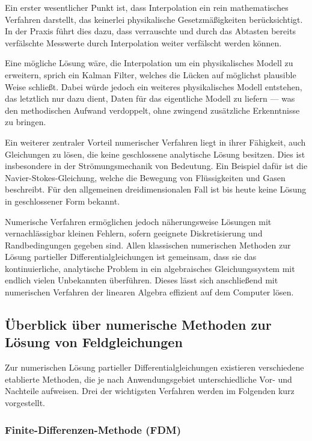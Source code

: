 Ein erster wesentlicher Punkt ist, dass Interpolation ein rein mathematisches Verfahren darstellt, das keinerlei physikalische Gesetzmäßigkeiten berücksichtigt.
In der Praxis führt dies dazu, dass verrauschte und durch das Abtasten bereits verfälschte Messwerte durch Interpolation weiter verfälscht werden können.

Eine mögliche Lösung wäre, die Interpolation um ein physikalisches Modell zu erweitern, sprich ein Kalman Filter, welches die Lücken auf möglichst plausible Weise schließt.
Dabei würde jedoch ein weiteres physikalisches Modell entstehen, das letztlich nur dazu dient, Daten für das eigentliche Modell zu liefern --- was den methodischen Aufwand verdoppelt, ohne zwingend zusätzliche Erkenntnisse zu bringen.

Ein weiterer zentraler Vorteil numerischer Verfahren liegt in ihrer Fähigkeit, auch Gleichungen zu lösen, die keine geschlossene analytische Lösung besitzen.
Dies ist insbesondere in der Strömungsmechanik von Bedeutung.
Ein Beispiel dafür ist die Navier-Stokes-Gleichung, welche die Bewegung von Flüssigkeiten und Gasen beschreibt.
Für den allgemeinen dreidimensionalen Fall ist bis heute keine Lösung in geschlossener Form bekannt.

Numerische Verfahren ermöglichen jedoch näherungsweise Lösungen mit vernachlässigbar kleinen Fehlern, sofern geeignete Diskretisierung und Randbedingungen gegeben sind.
Allen klassischen numerischen Methoden zur Lösung partieller Differentialgleichungen ist gemeinsam, dass sie das kontinuierliche, analytische Problem in ein algebraisches Gleichungssystem mit endlich vielen Unbekannten überführen.
Dieses lässt sich anschließend mit numerischen Verfahren der linearen Algebra effizient auf dem Computer lösen.

\subsection{Überblick über numerische Methoden zur Lösung von Feldgleichungen}

Zur numerischen Lösung partieller Differentialgleichungen existieren verschiedene etablierte Methoden, die je nach Anwendungsgebiet unterschiedliche Vor- und Nachteile aufweisen.
Drei der wichtigsten Verfahren werden im Folgenden kurz vorgestellt.

\subsubsection{Finite-Differenzen-Methode (FDM)}
\label{parallelisierung:section:fdm}

